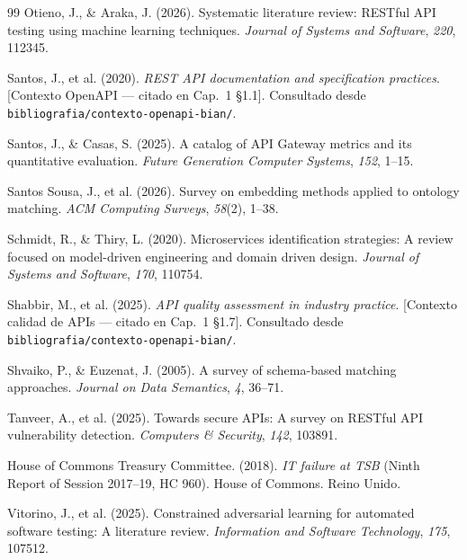 \begin{thebibliography}{99}
Otieno, J., \& Araka, J. (2026).
Systematic literature review: RESTful API testing using machine learning techniques.
\textit{Journal of Systems and Software}, \textit{220}, 112345.

Santos, J., et al. (2020).
\textit{REST API documentation and specification practices}.
[Contexto OpenAPI — citado en Cap.~1 §1.1].
Consultado desde \texttt{bibliografia/contexto-openapi-bian/}.

Santos, J., \& Casas, S. (2025).
A catalog of API Gateway metrics and its quantitative evaluation.
\textit{Future Generation Computer Systems}, \textit{152}, 1--15.

Santos Sousa, J., et al. (2026).
Survey on embedding methods applied to ontology matching.
\textit{ACM Computing Surveys}, \textit{58}(2), 1--38.

Schmidt, R., \& Thiry, L. (2020).
Microservices identification strategies: A review focused on model-driven engineering and domain driven design.
\textit{Journal of Systems and Software}, \textit{170}, 110754.

Shabbir, M., et al. (2025).
\textit{API quality assessment in industry practice}.
[Contexto calidad de APIs — citado en Cap.~1 §1.7].
Consultado desde \texttt{bibliografia/contexto-openapi-bian/}.

Shvaiko, P., \& Euzenat, J. (2005).
A survey of schema-based matching approaches.
\textit{Journal on Data Semantics}, \textit{4}, 36--71.

Tanveer, A., et al. (2025).
Towards secure APIs: A survey on RESTful API vulnerability detection.
\textit{Computers \& Security}, \textit{142}, 103891.

House of Commons Treasury Committee. (2018).
\textit{IT failure at TSB} (Ninth Report of Session 2017--19, HC 960).
House of Commons. Reino Unido.

Vitorino, J., et al. (2025).
Constrained adversarial learning for automated software testing: A literature review.
\textit{Information and Software Technology}, \textit{175}, 107512.

\end{thebibliography}
